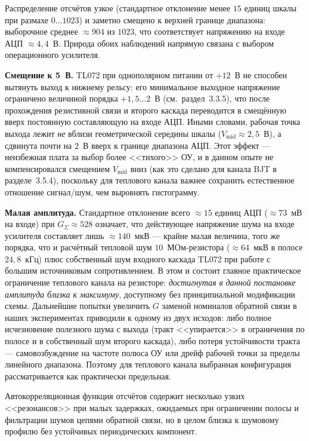 Распределение отсчётов узкое (стандартное отклонение менее $15$ единиц шкалы при
размахе $0\ldots 1023$) и заметно смещено к верхней границе диапазона: выборочное
среднее ${\approx}904$ из $1023$, что соответствует напряжению на входе АЦП
${\approx}4{,}4$~В. Природа обоих наблюдений напрямую связана с выбором
операционного усилителя.

\textbf{Смещение к 5~В.} TL072 при однополярном питании от $+12$~В не способен
вытянуть выход к нижнему рельсу: его минимальное выходное напряжение
ограничено величиной порядка $+1{,}5\ldots 2$~В (см.~раздел~3.3.5), что после
прохождения резистивной связи и второго каскада переводится в смещённую вверх
постоянную составляющую на входе АЦП. Иными словами, рабочая точка выхода
лежит \emph{не} вблизи геометрической середины шкалы ($V_\mathrm{mid}\approx
2{,}5$~В), а сдвинута почти на $2$~В вверх к границе диапазона АЦП. Этот
эффект --- неизбежная плата за выбор более <<тихого>> ОУ, и в данном опыте
не компенсировался смещением $V_\mathrm{mid}$ вниз (как это сделано для канала
BJT в разделе~3.5.4), поскольку для теплового канала важнее сохранить
естественное отношение сигнал/шум, чем выровнять гистограмму.

\textbf{Малая амплитуда.} Стандартное отклонение всего ${\approx}15$ единиц
АЦП (${\approx}73$~мВ на входе) при $G_\Sigma\approx 528$ означает, что
действующее напряжение шума на входе усилителя составляет лишь
${\approx}140$~мкВ --- крайне малая величина, того же порядка, что и
расчётный тепловой шум $10$~МОм-резистора (${\approx}64$~мкВ в полосе $24{,}8$~кГц)
плюс собственный шум входного каскада TL072 при работе с большим источниковым
сопротивлением. В этом и состоит главное практическое
ограничение теплового канала на резисторе: \emph{достигнутая в данной
постановке амплитуда близка к максимуму}, доступному без принципиальной
модификации схемы. Дальнейшие попытки увеличить $G$ заменой номиналов
обратной связи в наших экспериментах приводили к одному из двух исходов:
либо полное исчезновение полезного шума с выхода (тракт <<упирается>> в
ограничения по полосе и в собственный шум второго каскада), либо потеря
устойчивости тракта --- самовозбуждение на частоте полюса ОУ или дрейф
рабочей точки за пределы линейного диапазона. Поэтому для теплового канала
выбранная конфигурация рассматривается как практически предельная.

Автокорреляционная функция отсчётов содержит несколько узких <<резонансов>>
при малых задержках, ожидаемых при ограничении полосы и фильтрации шумов
цепями обратной связи, но в целом близка к шумовому профилю без устойчивых
периодических компонент.

